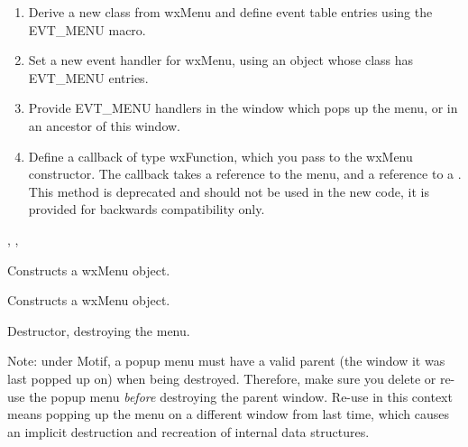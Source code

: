 \begin{enumerate}\itemsep=0pt
\item Derive a new class from wxMenu and define event table entries using the EVT\_MENU macro.
\item Set a new event handler for wxMenu, using an object whose class has EVT\_MENU entries.
\item Provide EVT\_MENU handlers in the window which pops up the menu, or in an ancestor of
this window.
\item Define a callback of type wxFunction, which you pass to the wxMenu constructor.
The callback takes a reference to the menu, and a reference to a
. This method is deprecated and should
not be used in the new code, it is provided for backwards compatibility only.
\end{enumerate}


, ,\rtfsp
{}


\label{wxmenuconstr}


Constructs a wxMenu object.





Constructs a wxMenu object.





Destructor, destroying the menu.

Note: under Motif, a popup menu must have a valid parent (the window
it was last popped up on) when being destroyed. Therefore, make sure
you delete or re-use the popup menu {\it before} destroying the
parent window. Re-use in this context means popping up the menu on
a different window from last time, which causes an implicit destruction
and recreation of internal data structures.

